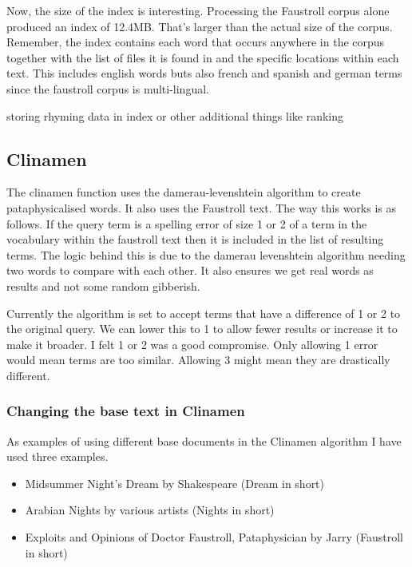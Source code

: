 Now, the size of the index is interesting. Processing the Faustroll corpus alone produced an index of 12.4MB. That's larger than the actual size of the corpus. Remember, the index contains each word that occurs anywhere in the corpus together with the list of files it is found in and the specific locations within each text. This includes english words buts also french and spanish and german terms since the faustroll corpus is multi-lingual.


storing rhyming data in index or other additional things like ranking


\subsection{Clinamen}

The clinamen function uses the damerau-levenshtein algorithm to create pataphysicalised words. It also uses the Faustroll text. The way this works is as follows. If the query term is a spelling error of size 1 or 2 of a term in the vocabulary within the faustroll text then it is included in the list of resulting terms. The logic behind this is due to the damerau levenshtein algorithm needing two words to compare with each other. It also ensures we get real words as results and not some random gibberish.

Currently the algorithm is set to accept terms that have a difference of 1 or 2 to the original query. We can lower this to 1 to allow fewer results or increase it to make it broader. I felt 1 or 2 was a good compromise. Only allowing 1 error would mean terms are too similar. Allowing 3 might mean they are drastically different.



\subsubsection{Changing the base text in Clinamen}
\label{s:basetext}

As examples of using different base documents in the Clinamen algorithm I have used three examples. 

\begin{itemize}
  \item Midsummer Night's Dream by Shakespeare (Dream in short)
  \item Arabian Nights by various artists (Nights in short)
  \item Exploits and Opinions of Doctor Faustroll, Pataphysician by Jarry (Faustroll in short)
\end{itemize}

